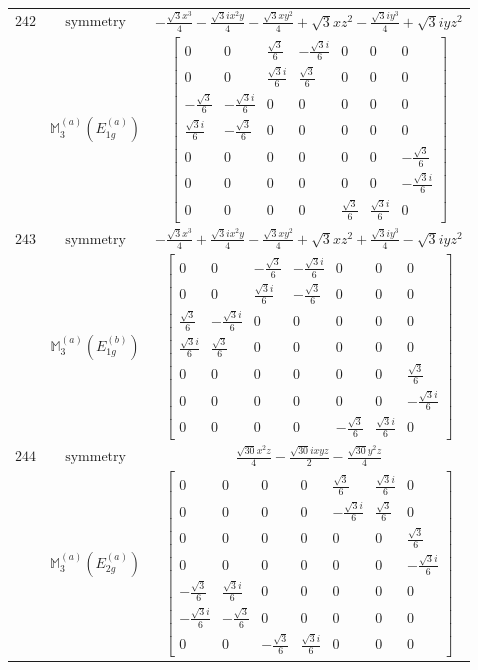 \documentclass[fleqn,8pt,landscape]{jsarticle}
\begin{document}
\begin{longtable}{ccc}
$ 242 $ & $ \text{symmetry} $ & $ - \frac{\sqrt{3} x^{3}}{4} - \frac{\sqrt{3} i x^{2} y}{4} - \frac{\sqrt{3} x y^{2}}{4} + \sqrt{3} x z^{2} - \frac{\sqrt{3} i y^{3}}{4} + \sqrt{3} i y z^{2} $ \\
$  $ & $ \mathbb{M}_{3}^{(a)}(E_{1g}^{(a)}) $ & $ \begin{bmatrix} 0 & 0 & \frac{\sqrt{3}}{6} & - \frac{\sqrt{3} i}{6} & 0 & 0 & 0 \\ 0 & 0 & \frac{\sqrt{3} i}{6} & \frac{\sqrt{3}}{6} & 0 & 0 & 0 \\ - \frac{\sqrt{3}}{6} & - \frac{\sqrt{3} i}{6} & 0 & 0 & 0 & 0 & 0 \\ \frac{\sqrt{3} i}{6} & - \frac{\sqrt{3}}{6} & 0 & 0 & 0 & 0 & 0 \\ 0 & 0 & 0 & 0 & 0 & 0 & - \frac{\sqrt{3}}{6} \\ 0 & 0 & 0 & 0 & 0 & 0 & - \frac{\sqrt{3} i}{6} \\ 0 & 0 & 0 & 0 & \frac{\sqrt{3}}{6} & \frac{\sqrt{3} i}{6} & 0 \end{bmatrix} $ \\ \hline
$ 243 $ & $ \text{symmetry} $ & $ - \frac{\sqrt{3} x^{3}}{4} + \frac{\sqrt{3} i x^{2} y}{4} - \frac{\sqrt{3} x y^{2}}{4} + \sqrt{3} x z^{2} + \frac{\sqrt{3} i y^{3}}{4} - \sqrt{3} i y z^{2} $ \\
$  $ & $ \mathbb{M}_{3}^{(a)}(E_{1g}^{(b)}) $ & $ \begin{bmatrix} 0 & 0 & - \frac{\sqrt{3}}{6} & - \frac{\sqrt{3} i}{6} & 0 & 0 & 0 \\ 0 & 0 & \frac{\sqrt{3} i}{6} & - \frac{\sqrt{3}}{6} & 0 & 0 & 0 \\ \frac{\sqrt{3}}{6} & - \frac{\sqrt{3} i}{6} & 0 & 0 & 0 & 0 & 0 \\ \frac{\sqrt{3} i}{6} & \frac{\sqrt{3}}{6} & 0 & 0 & 0 & 0 & 0 \\ 0 & 0 & 0 & 0 & 0 & 0 & \frac{\sqrt{3}}{6} \\ 0 & 0 & 0 & 0 & 0 & 0 & - \frac{\sqrt{3} i}{6} \\ 0 & 0 & 0 & 0 & - \frac{\sqrt{3}}{6} & \frac{\sqrt{3} i}{6} & 0 \end{bmatrix} $ \\ \hline
$ 244 $ & $ \text{symmetry} $ & $ \frac{\sqrt{30} x^{2} z}{4} - \frac{\sqrt{30} i x y z}{2} - \frac{\sqrt{30} y^{2} z}{4} $ \\
$  $ & $ \mathbb{M}_{3}^{(a)}(E_{2g}^{(a)}) $ & $ \begin{bmatrix} 0 & 0 & 0 & 0 & \frac{\sqrt{3}}{6} & \frac{\sqrt{3} i}{6} & 0 \\ 0 & 0 & 0 & 0 & - \frac{\sqrt{3} i}{6} & \frac{\sqrt{3}}{6} & 0 \\ 0 & 0 & 0 & 0 & 0 & 0 & \frac{\sqrt{3}}{6} \\ 0 & 0 & 0 & 0 & 0 & 0 & - \frac{\sqrt{3} i}{6} \\ - \frac{\sqrt{3}}{6} & \frac{\sqrt{3} i}{6} & 0 & 0 & 0 & 0 & 0 \\ - \frac{\sqrt{3} i}{6} & - \frac{\sqrt{3}}{6} & 0 & 0 & 0 & 0 & 0 \\ 0 & 0 & - \frac{\sqrt{3}}{6} & \frac{\sqrt{3} i}{6} & 0 & 0 & 0 \end{bmatrix} $ \\ \hline

\end{longtable}
\end{document}
